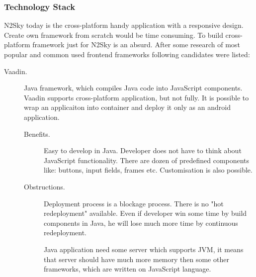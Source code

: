  

\subsubsection{Technology Stack}\label{Technology Stack}

N2Sky today is the cross-platform handy application with a responsive design. Create own framework from scratch would be time consuming. To build cross-platform framework just for N2Sky is an absurd. After some research of most popular and common used frontend frameworks following candidates were listed: 

\begin{description}
\item[Vaadin.] Java framework, which compiles Java code into JavaScript components. Vaadin supports cross-platform application, but not fully. It is possible to wrap an applicaiton into container and deploy it only as an android application.

\begin{description}
\item[Benefits.] Easy to develop in Java. Developer does not have to think about JavaScript functionality. There are dozen of predefined components like: buttons, input fields, frames etc. Customisation is also possible. 
\item[Obstructions.] Deployment process is a blockage process. There is no "hot redeployment" available. Even if developer win some time by build components in Java, he will lose much more time by continuous redeployment. 

Java application need some server which supports JVM, it means that server should have much more memory then some other frameworks, which are written on JavaScript language.  
\end{description}


\end{description}
